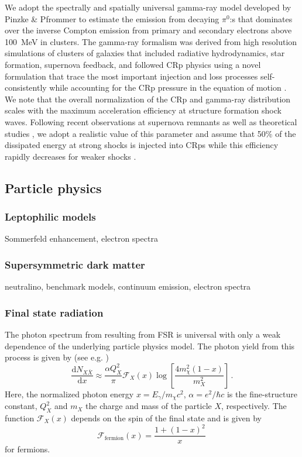 \documentclass[10pt,aps,pra,reprint,amsmath,amsfonts,amssymb,showpacs]{revtex4-1}
\newcommand{\rmn}{\mathrm}
\newcommand{\dd}{\rmn{d}}
\newcommand{\eg}{E_\gamma}
\begin{document}
We adopt the spectrally and spatially universal gamma-ray model
developed by Pinzke \& Pfrommer \cite{2010MNRAS.409..449P} to estimate
the emission from decaying $\pi^0$:s that dominates over the inverse
Compton emission from primary and secondary electrons above 100~MeV in
clusters. The gamma-ray formalism was derived from high resolution
simulations of clusters of galaxies that included radiative
hydrodynamics, star formation, supernova feedback, and followed CRp
physics using a novel formulation that trace the most important
injection and loss processes self-consistently while accounting for
the CRp pressure in the equation of motion
\cite{2008A&A...481...33J,2007A&A...473...41E,2006MNRAS.367..113P}.
We note that the overall normalization of the CRp and gamma-ray
distribution scales with the maximum acceleration efficiency at
structure formation shock waves. Following recent observations at
supernova remnants \cite{2009Sci...325..719H} as well as theoretical
studies \cite{2005ApJ...620...44K}, we adopt a realistic value of this
parameter and assume that 50\% of the dissipated energy at strong
shocks is injected into CRps while this efficiency rapidly decreases
for weaker shocks \cite{2007A&A...473...41E}.
 

\subsection{Particle physics}
\label{sect:PF}

\subsubsection{Leptophilic models}
\label{sect:LP}
Sommerfeld enhancement, electron spectra

\subsubsection{Supersymmetric dark matter}
neutralino, benchmark models, continuum emission, electron spectra 

\subsubsection{Final state radiation}
The photon spectrum from resulting from FSR is universal with only a
weak dependence of the underlying particle physics model. The photon
yield from this process is given by (see
e.g. \cite{2008JHEP...01..049B})
\begin{equation}
\frac{\dd N_{X \bar{X}}}{\dd x} \approx \frac{\alpha Q_X^2}{\pi}
\mathcal{F}_X(x) \log\left[\frac{4 m_\chi^2\left(1-x\right)}{m_X^2}\right]\,.
\end{equation}
Here, the normalized photon energy $x=\eg/m_\chi c^2$, $\alpha =
e^2/\hbar c$ is the fine-structure constant, $Q_X^2$ and $m_X$ the
charge and mass of the particle $X$, respectively. The function
$\mathcal{F}_X(x)$ depends on the spin of the final state and is given
by
\begin{equation}
\mathcal{F}_\rmn{fermion}(x) = \frac{1+\left(1-x\right)^2}{x}\,
\end{equation}
for fermions. 
\end{document}
